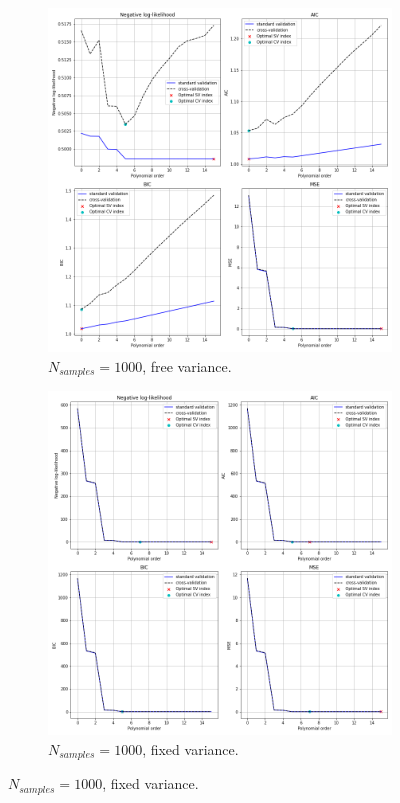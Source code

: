 \documentclass{article}
\begin{document}
\begin{figure}[!htb]
     \centering
     \begin{subfigure}[b]{0.45\textwidth}
         \centering
         \includegraphics[width=\textwidth]{Q2b_fig2.png}
         \caption{$N_{samples} = 1000$, free variance.}
     \end{subfigure}
     \hfill
     \begin{subfigure}[b]{0.45\textwidth}
         \centering
         \includegraphics[width=\textwidth]{Q2b_fig2_1.png}
         \caption{$N_{samples} = 1000$, fixed variance.}
     \end{subfigure}
     

\end{figure}
\end{document}
